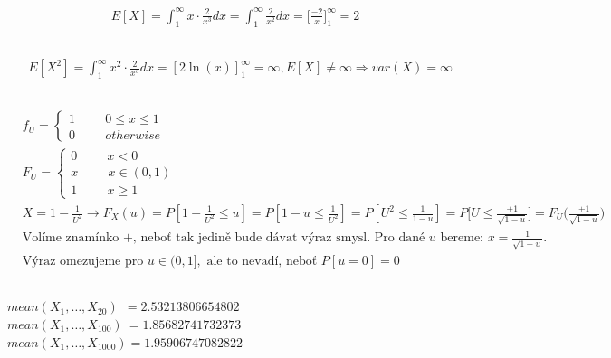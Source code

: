 \documentclass[a4paper]{article}
\newcommand{\tab}{\hspace{1cm}}
\begin{document}
\subsection{}
\begin{align*}
	E[X] = \int_1^\infty x \cdot \frac{2}{x^3} dx = \int_1^\infty \frac{2}{x^2} dx = \big[\frac{-2}{x}\big]_1^\infty = 2
\end{align*}

\subsection{}
\begin{align*}
	& E[X^2] = \int_1^\infty x^2 \cdot \frac{2}{x^3} dx = [2\ln(x)]_1^\infty = \infty, E[X] \ne \infty \Rightarrow var(X) = \infty
\end{align*}

\subsection{}
\begin{align*}
	& f_U = \begin{cases} 1 \tab 0 \le x \le 1 \\ 0 \tab otherwise \end{cases} \\
	& F_U = \begin{cases} 0 \tab x < 0 \\ x \tab x \in (0, 1) \\ 1 \tab x \ge 1 \end{cases} \\
	& X = 1-\frac{1}{U^2} \rightarrow F_X(u) = P[1-\frac{1}{U^2} \le u] = P[1-u \le \frac{1}{U^2}] = P[U^2 \le \frac{1}{1-u}] = P\bigg[U \le \frac{\pm 1}{\sqrt{1-u}} \bigg] = F_U \bigg(\frac{\pm 1}{\sqrt{1-u}}  \bigg) \\
	& \text{Volíme znamínko +, neboť tak jedině bude dávat výraz smysl. Pro dané $u$ bereme: } x = \frac{1}{\sqrt{1-u}}. \\ 
	& \text{Výraz omezujeme pro } u \in (0, 1], \text{ ale to nevadí, neboť } P[u=0] = 0 
\end{align*}

\subsection{}

$mean(X_1, \ldots, X_{20}) \ \text{}\ = 2.53213806654802$ \\
$mean(X_1, \ldots, X_{100}) \ = 1.85682741732373$ \\
$mean(X_1, \ldots, X_{1000}) = 1.95906747082822$ \\
\end{document}
